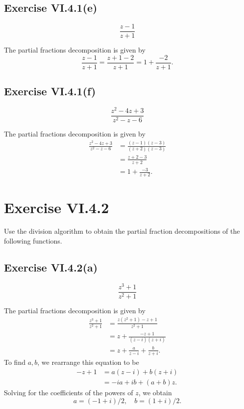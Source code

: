 \documentclass[12pt]{article}
\newenvironment{pbox}
    {\begin{lrbox}{\mybox}\begin{minipage}{0.98\textwidth}}
    {\end{minipage}\end{lrbox}\begin{center}\framebox[\textwidth]{\usebox{\mybox}}\end{center}}
\theoremstyle{definition}
\begin{document}
\subsection{Exercise VI.4.1(e)}
\begin{pbox}
    \[
        \frac{z - 1}{z + 1}
    \]
\end{pbox}

The partial fractions decomposition is given by
\[
    \frac{z - 1}{z + 1}
        = \frac{z + 1 - 2}{z + 1}
        = 1 + \frac{-2}{z + 1}.
\]

\subsection{Exercise VI.4.1(f)}
\begin{pbox}
    \[
        \frac{z^2 - 4z + 3}{z^2 - z - 6}
    \]
\end{pbox}

The partial fractions decomposition is given by
\begin{align*}
    \frac{z^2 - 4z + 3}{z^2 - z - 6}
        &= \frac{(z - 1)(z - 3)}{(z + 2)(z - 3)} \\
        &= \frac{z + 2 -3}{z + 2} \\
        &= 1 + \frac{-3}{z + 2}.
\end{align*}

\newpage
\section{Exercise VI.4.2}
\begin{pbox}
    Use the division algorithm to obtain the partial fraction decompositions of the following functions.
\end{pbox}

\subsection{Exercise VI.4.2(a)}
\begin{pbox}
    \[
        \frac{z^3 + 1}{z^2 + 1}
    \]
\end{pbox}

The partial fractions decomposition is given by
\begin{align*}
    \frac{z^3 + 1}{z^2 + 1}
        &= \frac{z(z^2 + 1) - z + 1}{z^2 + 1} \\
        &= z + \frac{-z + 1}{(z - i)(z + i)} \\
        &= z + \frac{a}{z - i} + \frac{b}{z + i}.
\end{align*}
To find $a, b$, we rearrange this equation to be
\begin{align*}
    -z + 1
        &= a(z - i) + b(z + i) \\
        &= -ia + ib + (a + b) z.
\end{align*}
Solving for the coefficients of the powers of $z$, we obtain
\[
    a = (-1 + i)/2, \quad b = (1 + i)/2.
\]
\end{document}
